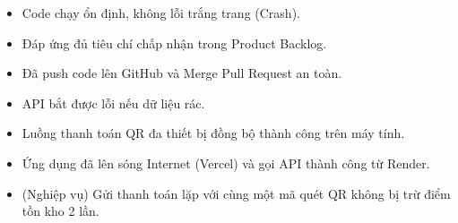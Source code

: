 \begin{itemize}
  \item[\fbox{\rule{0pt}{1.1ex}\rule{1.1ex}{0pt}}] Code chạy ổn định, không lỗi trắng trang (Crash).
  \item[\fbox{\rule{0pt}{1.1ex}\rule{1.1ex}{0pt}}] Đáp ứng đủ tiêu chí chấp nhận trong Product Backlog.
  \item[\fbox{\rule{0pt}{1.1ex}\rule{1.1ex}{0pt}}] Đã push code lên GitHub và Merge Pull Request an toàn.
  \item[\fbox{\rule{0pt}{1.1ex}\rule{1.1ex}{0pt}}] API bắt được lỗi nếu dữ liệu rác.
  \item[\fbox{\rule{0pt}{1.1ex}\rule{1.1ex}{0pt}}] Luồng thanh toán QR đa thiết bị đồng bộ thành công trên máy tính.
  \item[\fbox{\rule{0pt}{1.1ex}\rule{1.1ex}{0pt}}] Ứng dụng đã lên sóng Internet (Vercel) và gọi API thành công từ Render.
  \item[\fbox{\rule{0pt}{1.1ex}\rule{1.1ex}{0pt}}] (Nghiệp vụ) Gửi thanh toán lặp với cùng một mã quét QR không bị trừ điểm tồn kho 2 lần.
\end{itemize}